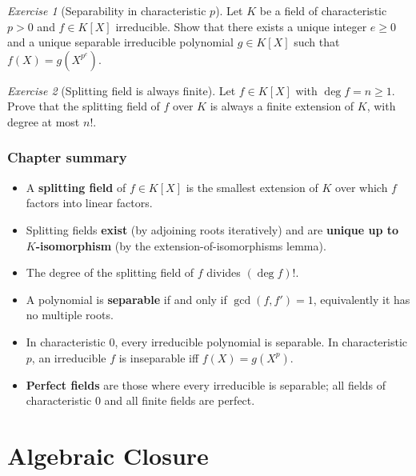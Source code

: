 \documentclass[12pt,a4paper,openany]{book}
\theoremstyle{definition}
\theoremstyle{remark}
\newtheorem{exercise}{Exercise}[chapter]
\renewcommand{\deg}{\operatorname{deg}}
\begin{document}
\begin{exercise}[Separability in characteristic $p$]
\label{exer:sep-char-p}
Let $K$ be a field of characteristic $p > 0$ and $f \in K[X]$
irreducible. Show that there exists a unique integer $e \ge 0$ and a
unique separable irreducible polynomial $g \in K[X]$ such that
$f(X) = g(X^{p^e})$.
\end{exercise}

\begin{exercise}[Splitting field is always finite]
\label{exer:split-always-finite}
Let $f \in K[X]$ with $\deg f = n \ge 1$. Prove that the splitting
field of $f$ over $K$ is always a finite extension of $K$, with degree
at most $n!$.
\end{exercise}

\subsection*{Chapter summary}

\begin{itemize}[leftmargin=2em]
  \item A \textbf{splitting field} of $f \in K[X]$ is the smallest
    extension of $K$ over which $f$ factors into linear factors.
  \item Splitting fields \textbf{exist} (by adjoining roots
    iteratively) and are \textbf{unique up to $K$-isomorphism}
    (by the extension-of-isomorphisms lemma).
  \item The degree of the splitting field of $f$ divides $(\deg f)!$.
  \item A polynomial is \textbf{separable} if and only if
    $\gcd(f, f') = 1$, equivalently it has no multiple roots.
  \item In characteristic $0$, every irreducible polynomial is
    separable. In characteristic $p$, an irreducible $f$ is
    inseparable iff $f(X) = g(X^p)$.
  \item \textbf{Perfect fields} are those where every irreducible is
    separable; all fields of characteristic $0$ and all finite fields
    are perfect.
\end{itemize}


\chapter{Algebraic Closure}
\label{ch:algebraic-closure}
\end{document}
